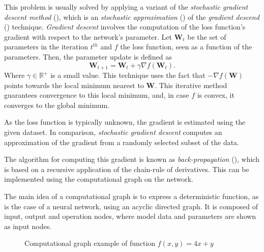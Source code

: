 This problem is usually solved by applying a variant of the \emph{stochastic gradient descent method} (\cite{kiefer1952stochastic}), which is an \emph{stochastic approximation} (\cite{Robbins2007ASA}) of the \emph{gradient descend} (\cite{cauchy1847methode}) technique. \emph{Gradient descent} involves the computation of the loss function's gradient with respect to the network's parameter. Let \(\bm{W}_{t}\) be the set of parameters in the iteration \(t^{th}\) and \(f\) the loss function, seen as a function of the parameters. Then, the parameter update is defined as
\[
  \bm{W}_{t+1} = \bm{W}_{t} + \gamma \nabla f(\bm{W}_{t}).
\]
Where \(\gamma \in \mathbb{R}^{+}\) is a small value. This technique uses the fact that \(- \nabla f(\bm{W})\) points towards the local minimum nearest to \(\bm{W}\). This iterative method guarantees convergence to this local minimum, and, in case \(f\) is convex, it converges to the global minimum.

As the loss function is typically unknown, the gradient is estimated using the given dataset. In comparison, \emph{stochastic gradient descent} computes an approximation of the gradient from a randomly selected subset of the data.

The algorithm for computing this gradient is known as \emph{back-propagation} (\cite{goodfellow2016deep}), which is based on a recursive application of the chain-rule of derivatives. This can be implemented using the computational graph on the network.

The main idea of a computational graph is to express a deterministic function, as is the case of a neural network, using an acyclic directed graph. It is composed of input, output and operation nodes, where model data and parameters are shown as input nodes.

\begin{figure}[H]
  \centering
  \caption{Computational graph example of function \(f(x,y) = 4x + y\) }\label{fig:cnn_cg}
\end{figure}

